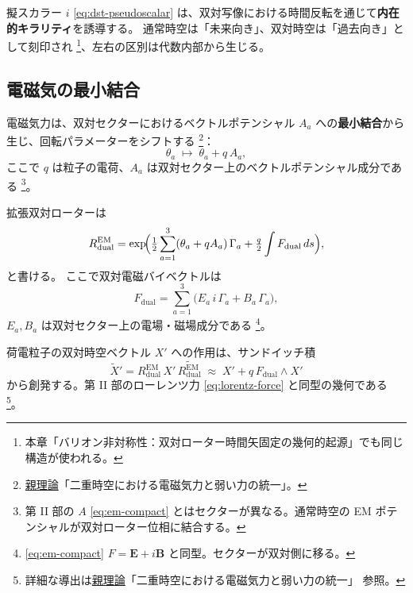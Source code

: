 \documentclass[dvipdfmx,a4paper,oneside]{jsbook}
\numberwithin{equation}{chapter}
\begin{document}
擬スカラー \(i\) \eqref{eq:dst-pseudoscalar} は、双対写像における時間反転を通じて\textbf{内在的キラリティ}を誘導する。
通常時空は「未来向き」、双対時空は「過去向き」として刻印され \footnote{本章「バリオン非対称性：双対ローター時間矢固定の幾何的起源」でも同じ構造が使われる。}、左右の区別は代数内部から生じる。

\subsection{電磁気の最小結合}

電磁気力は、双対セクターにおけるベクトルポテンシャル \(A_a\) への\textbf{最小結合}から生じ、回転パラメーターをシフトする \footnote{\hyperref[sec:sister-manuscripts]{親理論}「二重時空における電磁気力と弱い力の統一」。}：
\begin{equation}
  \theta_a \;\mapsto\; \theta_a + q\, A_a,
  \label{eq:unif-theta-shift}
\end{equation}
ここで \(q\) は粒子の電荷、\(A_a\) は双対セクター上のベクトルポテンシャル成分である \footnote{第 II 部の \(A\) \eqref{eq:em-compact} とはセクターが異なる。通常時空の EM ポテンシャルが双対ローター位相に結合する。}。

拡張双対ローターは
\begin{equation}
  R_{\mathrm{dual}}^{\mathrm{EM}}
  = \exp\!\Bigl(
    \tfrac{1}{2}\sum_{a=1}^{3}(\theta_a + q A_a)\,\Gamma_a
    + \tfrac{q}{2}\int F_{\mathrm{dual}}\, ds
  \Bigr),
  \label{eq:unif-R-dual-EM}
\end{equation}
と書ける。
ここで双対電磁バイベクトルは
\begin{equation}
  F_{\mathrm{dual}}
  = \sum_{a=1}^{3}\bigl(E_a\, i\,\Gamma_a + B_a\,\Gamma_a\bigr),
  \label{eq:unif-F-dual}
\end{equation}
\(E_a, B_a\) は双対セクター上の電場・磁場成分である \footnote{\eqref{eq:em-compact} \(F = \mathbf{E} + i\mathbf{B}\) と同型。セクターが双対側に移る。}。

荷電粒子の双対時空ベクトル \(X'\) への作用は、サンドイッチ積
\begin{equation}
  \tilde{X}'
  = R_{\mathrm{dual}}^{\mathrm{EM}}\, X'\, \widetilde{R_{\mathrm{dual}}^{\mathrm{EM}}}
  \;\approx\;
  X' + q\, F_{\mathrm{dual}} \wedge X'
  \label{eq:unif-lorentz}
\end{equation}
から創発する。第 II 部のローレンツ力 \eqref{eq:lorentz-force} と同型の幾何である \footnote{詳細な導出は\hyperref[sec:sister-manuscripts]{親理論}「二重時空における電磁気力と弱い力の統一」 参照。}。
\end{document}
